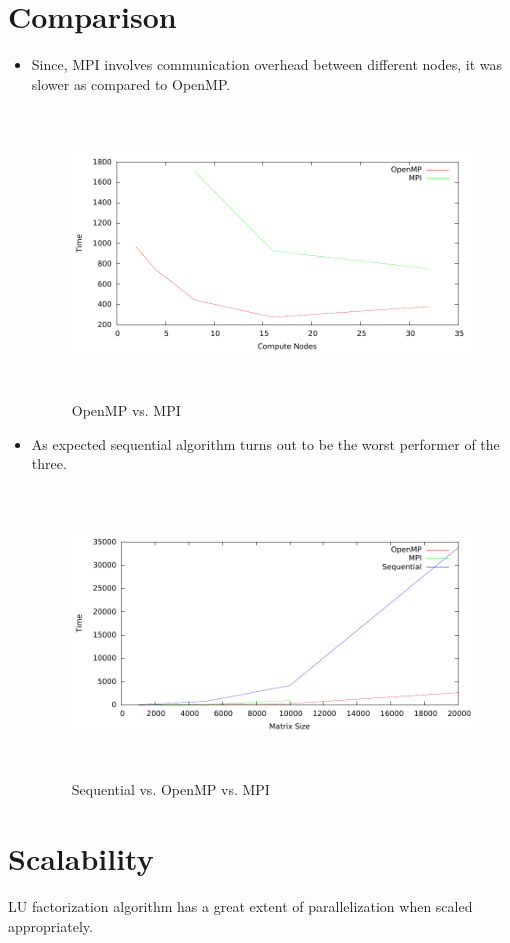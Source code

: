 \documentclass{article}
\begin{document}
\section{Comparison}
\begin{itemize}
\item Since, MPI involves communication overhead between different nodes, it was slower as compared to OpenMP. 

\begin{figure}[H]
\begin{center}
\includegraphics[height=3in,width=5in]{Graphs/omp_mpi_core_time.pdf}
\caption{OpenMP vs. MPI}
\end{center}
\end{figure}

\item As expected sequential algorithm turns out to be the worst performer of the three.

\begin{figure}[H]
\begin{center}
\includegraphics[height=3in,width=5in]{Graphs/omp_mpi_seq_siz_time.pdf}
\caption{Sequential vs. OpenMP vs. MPI}
\end{center}
\end{figure}

\end{itemize}

\section{Scalability}
LU factorization algorithm has a great extent of parallelization when scaled appropriately.
\end{document}
